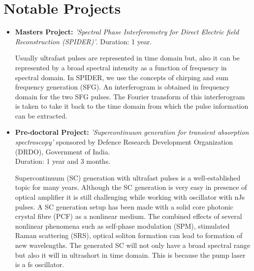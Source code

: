 \documentclass[11pt,a4paper,sans]{moderncv}        %
\begin{document}
\section{Notable Projects}

\vspace{5pt}

\begin{itemize}

\item{\textbf{Masters Project:} \textit{'Spectral Phase Interferometry for Direct Electric field Reconstruction (SPIDER)'}. Duration: 1 year.

\vspace{3pt}

\small{Usually ultrafast pulses are represented in time domain but, also it can be represented by a broad spectral intensity as a function of frequency in spectral domain. In SPIDER, we use the concepts of chirping and sum frequency generation (SFG). An interferogram is obtained in frequency domain for the two SFG pulses. The Fourier transform of this interferogram is taken to take it back to the time domain from which the pulse information can be extracted.}}

\vspace{6pt}

\item{\textbf{Pre-doctoral Project:} \textit{'Supercontinuum generation for transient absorption spectroscopy'} sponsored by Defence Research Development Organization (DRDO), Government of India.\\ Duration: 1 year and 3 months.
	
\vspace{3pt}
	
\small{Supercontinuum (SC) generation with ultrafast pulses is a well-established topic for many years. Although the SC generation is very easy in presence of optical amplifier it is still challenging while working with oscillator with nJs pulses. A SC generation setup has been made with a solid core photonic crystal fibre (PCF) as a nonlinear medium. The combined effects of several nonlinear phenomena such as self-phase modulation (SPM), stimulated Raman scattering (SRS), optical soliton formation can lead to formation of new wavelengths. The generated SC will not only have a broad spectral range but also it will in ultrashort in time domain. This is because the pump laser is a fs oscillator.}}

\vspace{6pt}


\end{itemize}
\end{document}
